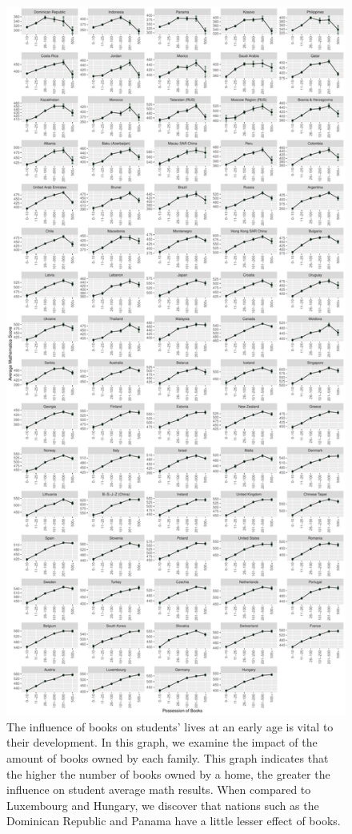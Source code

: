 \begin{Schunk}
\begin{figure}[H]
\includegraphics[width=1\linewidth]{learningtower_files/figure-latex/book-plot-1} \caption[The influence of books on students' lives at an early age is vital to their development]{The influence of books on students' lives at an early age is vital to their development. In this graph, we examine the impact of the amount of books owned by each family. This graph indicates that the higher the number of books owned by a home, the greater the influence on student average math results. When compared to Luxembourg and Hungary, we discover that nations such as the Dominican Republic and Panama have a little lesser effect of books.}\label{fig:book-plot}
\end{figure}
\end{Schunk}

